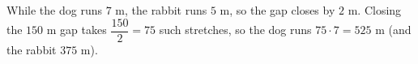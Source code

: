 While the dog runs $7$ m, the rabbit runs $5$ m, so the gap closes by $2$ m. Closing the $150$ m gap takes $\dfrac{150}{2}=75$ such stretches, so the dog runs $75\cdot7=\boxed{525\text{ m}}$ (and the rabbit $375$ m).
